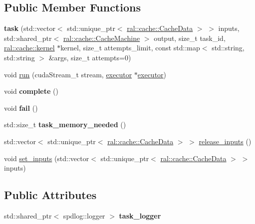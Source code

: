 \subsection*{Public Member Functions}
\begin{DoxyCompactItemize}
\item 
\mbox{\label{classral_1_1execution_1_1task_a6ba325f45c584b8e74fc56371baa2e17}} 
{\bfseries task} (std\+::vector$<$ std\+::unique\+\_\+ptr$<$ \hyperlink{classral_1_1cache_1_1CacheData}{ral\+::cache\+::\+Cache\+Data} $>$ $>$ inputs, std\+::shared\+\_\+ptr$<$ \hyperlink{classral_1_1cache_1_1CacheMachine}{ral\+::cache\+::\+Cache\+Machine} $>$ output, size\+\_\+t task\+\_\+id, \hyperlink{classral_1_1cache_1_1kernel}{ral\+::cache\+::kernel} $\ast$kernel, size\+\_\+t attempts\+\_\+limit, const std\+::map$<$ std\+::string, std\+::string $>$ \&args, size\+\_\+t attempts=0)
\item 
void \hyperlink{classral_1_1execution_1_1task_ad4b6bafee29648cb7893a521342a69ec}{run} (cuda\+Stream\+\_\+t stream, \hyperlink{classral_1_1execution_1_1executor}{executor} $\ast$\hyperlink{classral_1_1execution_1_1executor}{executor})
\item 
\mbox{\label{classral_1_1execution_1_1task_a5491844e693a3d05bf55be12cf503e7d}} 
void {\bfseries complete} ()
\item 
\mbox{\label{classral_1_1execution_1_1task_a4cc54125fe1f1589e154dec76de66c42}} 
void {\bfseries fail} ()
\item 
\mbox{\label{classral_1_1execution_1_1task_afb6c1d63c7469d41a63cd436be7caec5}} 
std\+::size\+\_\+t {\bfseries task\+\_\+memory\+\_\+needed} ()
\item 
std\+::vector$<$ std\+::unique\+\_\+ptr$<$ \hyperlink{classral_1_1cache_1_1CacheData}{ral\+::cache\+::\+Cache\+Data} $>$ $>$ \hyperlink{classral_1_1execution_1_1task_a6b0526afb984d7f2e7fb83fd7c1913ec}{release\+\_\+inputs} ()
\item 
void \hyperlink{classral_1_1execution_1_1task_a9d1c2ebe66d6ada25cc1eccb246774b9}{set\+\_\+inputs} (std\+::vector$<$ std\+::unique\+\_\+ptr$<$ \hyperlink{classral_1_1cache_1_1CacheData}{ral\+::cache\+::\+Cache\+Data} $>$ $>$ inputs)
\end{DoxyCompactItemize}
\subsection*{Public Attributes}
\begin{DoxyCompactItemize}
\item 
\mbox{\label{classral_1_1execution_1_1task_a51027de29a91b194d52dec9091cd3037}} 
std\+::shared\+\_\+ptr$<$ spdlog\+::logger $>$ {\bfseries task\+\_\+logger}
\end{DoxyCompactItemize}
